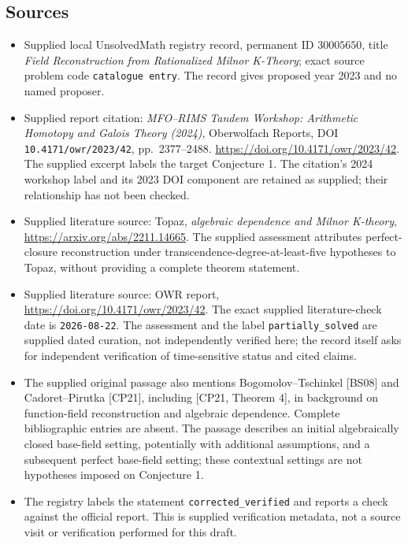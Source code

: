 \documentclass[11pt]{article}
\begin{document}
\subsection{Sources}
\begin{itemize}
\item Supplied local UnsolvedMath registry record, permanent ID \(30005650\), title \emph{Field Reconstruction from Rationalized Milnor K-Theory}; exact source problem code \texttt{catalogue entry}. The record gives proposed year 2023 and no named proposer.
\item Supplied report citation: \emph{MFO--RIMS Tandem Workshop: Arithmetic Homotopy and Galois Theory (2024)}, Oberwolfach Reports, DOI \texttt{10.4171/owr/2023/42}, pp.\ 2377--2488. \url{https://doi.org/10.4171/owr/2023/42}. The supplied excerpt labels the target Conjecture 1. The citation's 2024 workshop label and its 2023 DOI component are retained as supplied; their relationship has not been checked.
\item Supplied literature source: Topaz, \emph{algebraic dependence and Milnor K-theory}, \url{https://arxiv.org/abs/2211.14665}. The supplied assessment attributes perfect-closure reconstruction under transcendence-degree-at-least-five hypotheses to Topaz, without providing a complete theorem statement.
\item Supplied literature source: OWR report, \url{https://doi.org/10.4171/owr/2023/42}. The exact supplied literature-check date is \texttt{2026-08-22}. The assessment and the label \texttt{partially\_solved} are supplied dated curation, not independently verified here; the record itself asks for independent verification of time-sensitive status and cited claims.
\item The supplied original passage also mentions Bogomolov--Tschinkel [BS08] and Cadoret--Pirutka [CP21], including [CP21, Theorem 4], in background on function-field reconstruction and algebraic dependence. Complete bibliographic entries are absent. The passage describes an initial algebraically closed base-field setting, potentially with additional assumptions, and a subsequent perfect base-field setting; these contextual settings are not hypotheses imposed on Conjecture 1.
\item The registry labels the statement \texttt{corrected\_verified} and reports a check against the official report. This is supplied verification metadata, not a source visit or verification performed for this draft.
\end{itemize}
\end{document}
